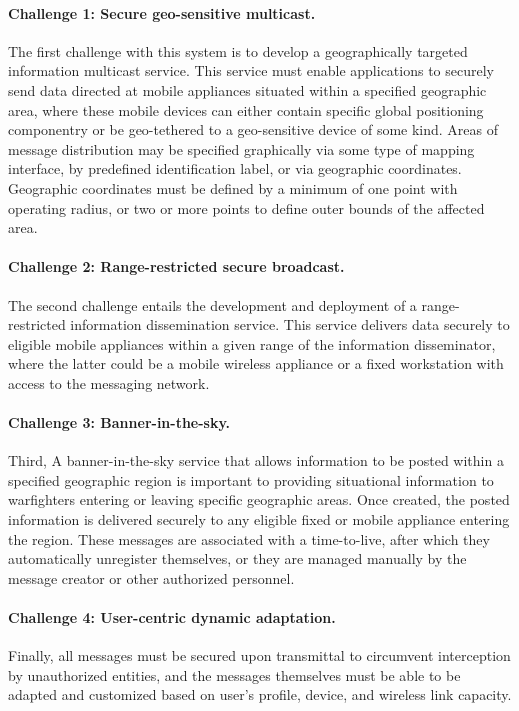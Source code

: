 \documentclass{sbir}
\begin{document}
\paragraph{Challenge 1: Secure geo-sensitive multicast.} The first challenge with this system is to develop a geographically targeted information multicast service. This service must enable applications to securely send data directed at mobile appliances situated within a specified geographic area, where these mobile devices can either contain specific global positioning componentry or be geo-tethered to a geo-sensitive device of some kind. Areas of message distribution may be specified graphically via some type of mapping interface, by predefined identification label, or via geographic coordinates. Geographic coordinates must be defined by a minimum of one point with operating radius, or two or more points to define outer bounds of the affected area.

\paragraph{Challenge 2: Range-restricted secure broadcast.} The second challenge entails the development and deployment of a range-restricted information dissemination service. This service delivers data securely to eligible mobile appliances within a given range of the information disseminator, where the latter could be a mobile wireless appliance or a fixed workstation with access to the messaging network.

\paragraph{Challenge 3: Banner-in-the-sky.} Third, A banner-in-the-sky service that allows information to be posted within a specified geographic region is important to providing situational information to warfighters entering or leaving specific geographic areas. Once created, the posted information is  delivered securely to any eligible fixed or mobile appliance entering the region. These messages are associated with a time-to-live, after which they automatically unregister themselves, or they are managed manually by the message creator or other authorized personnel.

\paragraph{Challenge 4: User-centric dynamic adaptation.} Finally, all messages must be secured upon transmittal to circumvent interception by unauthorized entities, and the messages themselves must be able to be adapted and customized based on user's profile, device, and wireless link capacity.
\end{document}
